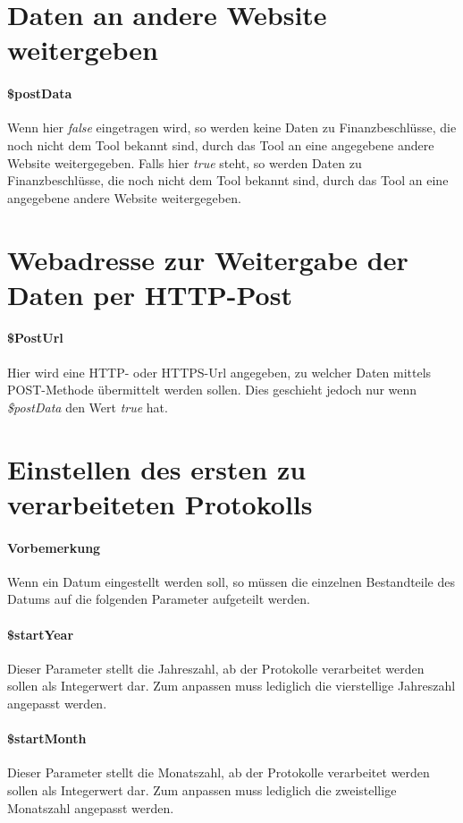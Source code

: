 \documentclass[12pt,parskip=full, pagea4]{scrreprt}
\begin{document}
	\section{Daten an andere Website weitergeben}
	\paragraph{\$postData} Wenn hier \textit{false} eingetragen wird, so werden keine Daten zu Finanzbeschlüsse, die noch nicht dem Tool bekannt sind, durch das Tool an eine angegebene andere Website weitergegeben. Falls hier \textit{true} steht, so werden Daten zu Finanzbeschlüsse, die noch nicht dem Tool bekannt sind, durch das Tool an eine angegebene andere Website weitergegeben.
	
	\section{Webadresse zur Weitergabe der Daten per HTTP-Post}
	\paragraph{\$PostUrl} Hier wird eine HTTP- oder HTTPS-Url angegeben, zu welcher Daten mittels POST-Methode übermittelt werden sollen. Dies geschieht jedoch nur wenn \textit{\$postData} den Wert \textit{true} hat.
	
	\section{Einstellen des ersten zu verarbeiteten Protokolls}
	\paragraph{Vorbemerkung} Wenn ein Datum eingestellt werden soll, so müssen die einzelnen Bestandteile des Datums auf die folgenden Parameter aufgeteilt werden.
	\paragraph{\$startYear} Dieser Parameter stellt die Jahreszahl, ab der Protokolle verarbeitet werden sollen als Integerwert dar. Zum anpassen muss lediglich die vierstellige Jahreszahl angepasst werden.
	\paragraph{\$startMonth} Dieser Parameter stellt die Monatszahl, ab der Protokolle verarbeitet werden sollen als Integerwert dar. Zum anpassen muss lediglich die zweistellige Monatszahl angepasst werden.
\end{document}
